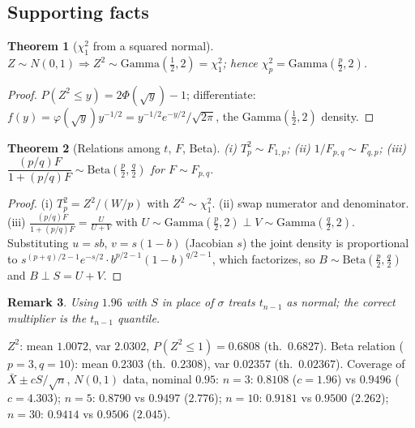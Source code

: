 \documentclass[11pt]{article}
\newtheorem{theorem}{Theorem}[section]
\newtheorem{remark}[theorem]{Remark}
\begin{document}
\subsection{Supporting facts}
\begin{theorem}[$\chi^2_1$ from a squared normal]
$Z\sim N(0,1)\Rightarrow Z^2\sim\mathrm{Gamma}(\tfrac12,2)=\chi^2_1$; hence $\chi^2_p=\mathrm{Gamma}(\tfrac p2,2)$.
\end{theorem}
\begin{proof}
$P(Z^2\le y)=2\Phi(\sqrt y)-1$; differentiate: $f(y)=\varphi(\sqrt y)y^{-1/2}=y^{-1/2}e^{-y/2}/\sqrt{2\pi}$, the Gamma$(\frac12,2)$ density.
\end{proof}
\begin{theorem}[Relations among $t$, $F$, Beta]
(i) $T_p^2\sim F_{1,p}$; (ii) $1/F_{p,q}\sim F_{q,p}$; (iii) $\dfrac{(p/q)F}{1+(p/q)F}\sim\mathrm{Beta}(\frac p2,\frac q2)$ for $F\sim F_{p,q}$.
\end{theorem}
\begin{proof}
(i) $T_p^2=Z^2/(W/p)$ with $Z^2\sim\chi^2_1$. (ii) swap numerator and denominator. (iii) $\frac{(p/q)F}{1+(p/q)F}=\frac{U}{U+V}$ with $U\sim\mathrm{Gamma}(\frac p2,2)\perp V\sim\mathrm{Gamma}(\frac q2,2)$. Substituting $u=sb$, $v=s(1-b)$ (Jacobian $s$) the joint density is proportional to $s^{(p+q)/2-1}e^{-s/2}\cdot b^{p/2-1}(1-b)^{q/2-1}$, which factorizes, so $B\sim\mathrm{Beta}(\frac p2,\frac q2)$ and $B\perp S=U+V$.
\end{proof}
\begin{remark}
Using $1.96$ with $S$ in place of $\sigma$ treats $t_{n-1}$ as normal; the correct multiplier is the $t_{n-1}$ quantile.
\end{remark}
\begin{simbox}
$Z^2$: mean $1.0072$, var $2.0302$, $P(Z^2\le1)=0.6808$ (th.\ $0.6827$). Beta relation ($p=3,q=10$): mean $0.2303$ (th.\ $0.2308$), var $0.02357$ (th.\ $0.02367$). Coverage of $\bar X\pm cS/\sqrt n$, $N(0,1)$ data, nominal $0.95$: $n=3$: $0.8108$ ($c=1.96$) vs $0.9496$ ($c=4.303$); $n=5$: $0.8790$ vs $0.9497$ ($2.776$); $n=10$: $0.9181$ vs $0.9500$ ($2.262$); $n=30$: $0.9414$ vs $0.9506$ ($2.045$).
\end{simbox}
\end{document}
